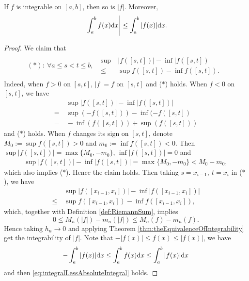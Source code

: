 \begin{thm}
  \label{thm:integrabilityImpliesAbsoluteIntegrability}
  If $f$ is integrable on $[a,b]$, then so is $|f|$. Moreover,
  \begin{equation}
    \label{eq:integralLessAbsoluteIntegral}
    \left| \int_{a}^{b}f(x)\mathrm{d} x  \right|
    \le \int_{a}^{b}|f(x)|\mathrm{d} x.
  \end{equation}
\end{thm}
\begin{proof}
  We claim that
  \begin{align*}
    (*):\
    \forall  a\le s<t\le b,\ 
    \begin{array}{l}
      \begin{aligned}
         \sup &\ |f([s,t])|-\inf |f([s,t])|\\
      \le &\ \sup f([s,t])-\inf f([s,t]).
      \end{aligned}    
    \end{array} 
  \end{align*}
  Indeed, when $f>0$ on $[s,t]$, $|f|=f$ on $[s,t]$ and ($*$) holds.
  When $f<0$ on $[s,t]$, we have
  \begin{align*}
     &\ \sup |f([s,t])|-\inf |f([s,t])|\\
    =&\ \sup(-f([s,t]))-\inf(-f([s,t])\\
    =&\ -\inf(f([s,t]))+\sup(f([s,t]))
  \end{align*}
  and ($*$) holds.
  When $f$ changes its sign on $[s,t]$,
  denote $M_{0}:=\sup f([s,t])>0$ and $m_{0}:=\inf f([s,t])<0$.
  Then
  $ \sup |f([s,t])|=\max\{M_{0},-m_{0}\}$, $\inf |f([s,t])|=0$
  and
  \begin{align*}
    \sup |f([s,t])|-\inf |f([s,t])|=\max\{M_{0},-m_{0}\}<M_{0}-m_{0},
  \end{align*}
  which also implies ($*$). Hence the claim holds.
  Then taking $s=x_{i-1},\ t=x_{i}$ in ($*$), we have
  \begin{align*}
    &\ \sup |f([x_{i-1},x_{i}])|-\inf |f([x_{i-1},x_{i}])|\\
    \le &\ \sup f([x_{i-1},x_{i}])-\inf f([x_{i-1},x_{i}]),
  \end{align*}
  which, together with Definition \ref{def:RiemannSum},
  implies
  \begin{displaymath}
    0\le M_{n}(|f|)-m_{n}(|f|)\le M_{n}(f)-m_{n}(f).
  \end{displaymath}
  Hence taking $h_{n}\rightarrow 0$ and applying Theorem
  \ref{thm:theEquivalenceOfIntegrability} get the integrability of $|f|$.
  Note that $-|f(x)|\le f(x)\le |f(x)|$,
  we have
  \begin{displaymath}
    -\int_{a}^{b}|f(x)|\mathrm{d} x\le \int_{a}^{b}f(x)\mathrm{d} x
    \le \int_{a}^{b}|f(x)|\mathrm{d} x
  \end{displaymath}
  and then \eqref{eq:integralLessAbsoluteIntegral} holds.
\end{proof}

